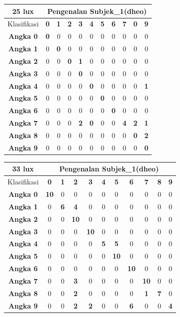 \begin{tabular}{|c|c|c|c|c|c|c|c|c|c|c|}
	\hline 25 lux
	& \multicolumn{10}{|c|}{Pengenalan Subjek\_1(dheo)} \\
	\hline  Klasifikasi&\textbf{0} &\textbf{1} &\textbf{2} &\textbf{3} &\textbf{4}&\textbf{5} &\textbf{6}&\textbf{7}&\textbf{0}&\textbf{9}\\
	\hline \textbf{Angka 0} &\textbf{0} &0 &0 &0 &0 &0 &0 &0 &0 &0\\
	\hline \textbf{Angka 1} &0 &\textbf{0} &0 &0 &0 &0 &0 &0 &0 &0\\
	\hline \textbf{Angka 2} &0 &0 &\textbf{0} &\textbf{1} &0 &0 &0 &0 &0 &0\\
	\hline \textbf{Angka 3} &0 &0 &0 &\textbf{0} &0 &0 &0 &0 &0 &0\\
	\hline \textbf{Angka 4} &0 &0 &0 &0 &\textbf{0} &0 &0 &0 &0 &\textbf{1}\\
	\hline \textbf{Angka 5} &0 &0 &0 &0 &0 &\textbf{0} &0 &0 &0 &0\\
	\hline \textbf{Angka 6} &0 &0 &0 &0 &0 &0 &\textbf{0} &0 &0 &0\\
	\hline \textbf{Angka 7} &0 &0 &0 &\textbf{2} &\textbf{0} &0 &0 &\textbf{4} &\textbf{2} &\textbf{1}\\
	\hline \textbf{Angka 8} &0 &0 &0 &0 &0 &0 &0 &0 &\textbf{0} &\textbf{2} \\
	\hline \textbf{Angka 9} &0 &0 &0 &0 &0 &0 &0 &0 &0 &\textbf{0} \\
	\hline
\end{tabular}

\begin{tabular}{|c|c|c|c|c|c|c|c|c|c|c|}
	\hline 33 lux
	& \multicolumn{10}{|c|}{Pengenalan Subjek\_1(dheo)} \\
	\hline  Klasifikasi&\textbf{0} &\textbf{1} &\textbf{2} &\textbf{3} &\textbf{4}&\textbf{5} &\textbf{6}&\textbf{7}&\textbf{8}&\textbf{9}\\
	\hline \textbf{Angka 0} &\textbf{10} &0 &0 &0 &0 &0 &0 &0 &0 &0\\
	\hline \textbf{Angka 1} &0 &\textbf{6} &\textbf{4} &0 &0 &0 &0 &0 &0 &0\\
	\hline \textbf{Angka 2} &0 &0 &\textbf{10} &0 &0 &0 &0 &0 &0 &0\\
	\hline \textbf{Angka 3} &0 &0 &0 &\textbf{10} &0 &0 &0 &0 &0 &0\\
	\hline \textbf{Angka 4} &0 &0 &0 &0 &\textbf{5} &\textbf{5} &0 &0 &0 &0\\
	\hline \textbf{Angka 5} &0 &0 &0 &0 &0 &\textbf{10} &0 &0 &0 &0\\
	\hline \textbf{Angka 6} &0 &0 &0 &0 &0 &0 &\textbf{10} &0 &0 &0\\
	\hline \textbf{Angka 7} &0 &0 &\textbf{3} &0 &0 &0 &0 &\textbf{10} &0 &0\\
	\hline \textbf{Angka 8} &0 &0 &\textbf{2} &0 &0 &0 &0 &\textbf{1} &\textbf{7} &0 \\
	\hline \textbf{Angka 9} &0 &0 &\textbf{2} &\textbf{2} &0 &0 &\textbf{6} &0 &0 &\textbf{4} \\
	\hline
\end{tabular}

